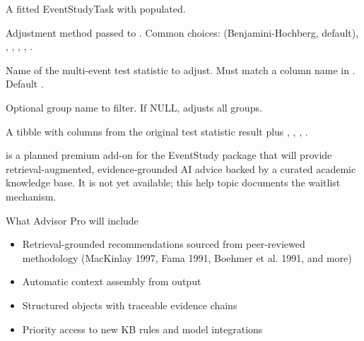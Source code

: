 \documentclass[a4paper]{book}
\begin{document}
\begin{Arguments}
\begin{ldescription}
\item[\code{task}] A fitted EventStudyTask with  populated.

\item[\code{method}] Adjustment method passed to .
Common choices:  (Benjamini-Hochberg, default), ,
, , , .

\item[\code{stat\_name}] Name of the multi-event test statistic to adjust.
Must match a column name in . Default .

\item[\code{group}] Optional group name to filter. If NULL, adjusts all groups.
\end{ldescription}
\end{Arguments}
%
\begin{Value}
A tibble with columns from the original test statistic result plus
, , , .
\end{Value}
%
\begin{Description}
 is a planned premium add-on for the EventStudy package
that will provide retrieval-augmented, evidence-grounded AI advice backed by
a curated academic knowledge base.  It is not yet available; this help topic
documents the waitlist mechanism.
\end{Description}
%
\begin{Section}{What Advisor Pro will include}

\begin{itemize}

\item{} Retrieval-grounded recommendations sourced from peer-reviewed
methodology (MacKinlay 1997, Fama 1991, Boehmer et al. 1991, and more)
\item{} Automatic context assembly from  output
\item{} Structured  objects with traceable evidence chains
\item{} Priority access to new KB rules and model integrations

\end{itemize}

\end{Section}
\end{document}
